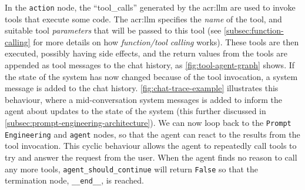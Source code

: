 In the \texttt{action} node, the \enquote{tool\_calls} generated by the \acrshort{acr:llm} are used to invoke tools that execute some code. The \acrshort{acr:llm} specifies the \textit{name} of the tool, and suitable tool \textit{parameters} that will be passed to this tool (see \autoref{subsec:function-calling} for more details on how \textit{function/tool calling} works). These tools are then executed, possibly having side effects, and the return values from the tools are appended as tool messages to the chat history, as \autoref{fig:tool-agent-graph} shows. If the state of the system has now changed because of the tool invocation, a system message is added to the chat history. \autoref{fig:chat-trace-example} illustrates this behaviour, where a mid-conversation system messages is added to inform the agent about updates to the state of the system (this further discussed in \autoref{subsec:prompt-engineering-architecture}). We can now loop back to the \texttt{Prompt Engineering} and \texttt{agent} nodes, so that the agent can react to the results from the tool invocation. This cyclic behaviour allows the agent to repeatedly call tools to try and answer the request from the user. When the agent finds no reason to call any more tools, \texttt{agent\_should\_continue} will return \texttt{False} so that the termination node, \texttt{\_\_end\_\_}, is reached.

